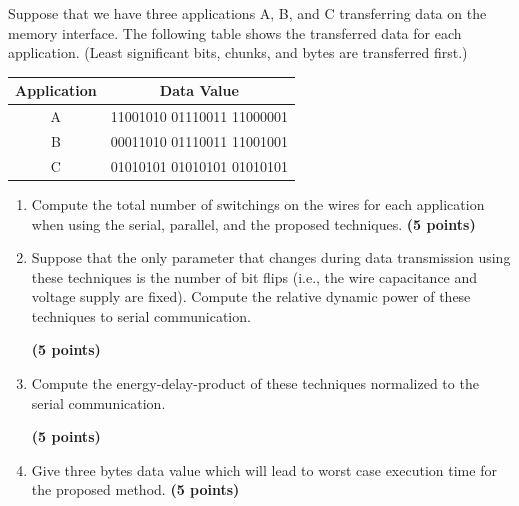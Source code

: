 \documentclass[a4paper, 15pt]{exam}
\begin{document}
\begin{enumerate}
Suppose that we have three applications A, B, and C transferring data on the memory interface. The following table shows the transferred data for each application.
(Least significant bits, chunks, and bytes are transferred first.)
\begin{center}
\begin{tabular}{ |c|c|} 
 \hline
  
  Application &Data Value\\ 
  \hline
 A&11001010 01110011 11000001\\ 
 \hline
 B&
00011010 01110011 11001001
\\ 
 \hline
 C&
01010101 01010101 01010101
\\ 
 \hline
\end{tabular}
\end{center}
\begin{enumerate}
\item Compute the total number of switchings on the wires for each application when using the serial, parallel, and the proposed techniques.
\textbf{(5 points)} \\
\item Suppose that the only parameter that changes during data transmission using these techniques is the number of bit flips (i.e., the wire capacitance and voltage supply are fixed). Compute the relative dynamic power of these techniques to serial communication.

\textbf {(5 points)} \\

\item Compute the energy-delay-product of these techniques normalized to the serial communication.

\textbf{(5 points)} \\
\item  Give three bytes data value which will lead to worst case execution time for the proposed method. 
\textbf{(5 points)} \\


\end{enumerate}
\end{enumerate}
\end{document}
